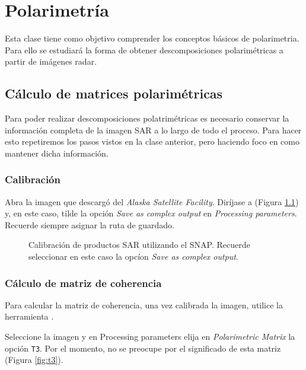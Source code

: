\chapter{Polarimetría}

Esta clase tiene como objetivo comprender los conceptos básicos de polarimetria. Para ello se estudiará la forma de obtener descomposiciones polarimétricas a partir de imágenes radar.

\section{Cálculo de matrices polarimétricas}

Para poder realizar descomposiciones polatrimétricas es necesario conservar la información completa de la imagen SAR a lo largo de todo el proceso. Para hacer esto repetiremos los pasos vistos en la clase anterior, pero haciendo foco en como mantener dicha información.

\subsection{Calibración}
Abra la imagen  que descargó del \emph{Alaska Satellite Facility}.  Diríjase a  (Figura \ref{fig:calibrar-2}) y, en este caso, tilde la opción \emph{Save as complex output} en \emph{Processing parameters}. Recuerde siempre asignar la ruta de guardado.

\begin{figure}[h!]
    \centering
    \hspace{1cm}
    \caption{Calibración de productos SAR utilizando el SNAP. Recuerde seleccionar en este caso la opcíon \emph{Save as complex output}.}
    \label{fig:calibrar-2}
\end{figure}

\subsection{Cálculo de matriz de coherencia}

Para calcular la matriz de coherencia, una vez calibrada la imagen, utilice la herramienta .

Seleccione la imagen  y en Processing parameters elija en \emph{Polarimetric Matrix} la opción \texttt{T3}. Por el momento, no se preocupe por el significado de esta matriz (Figura \ref{fig:t3}).

